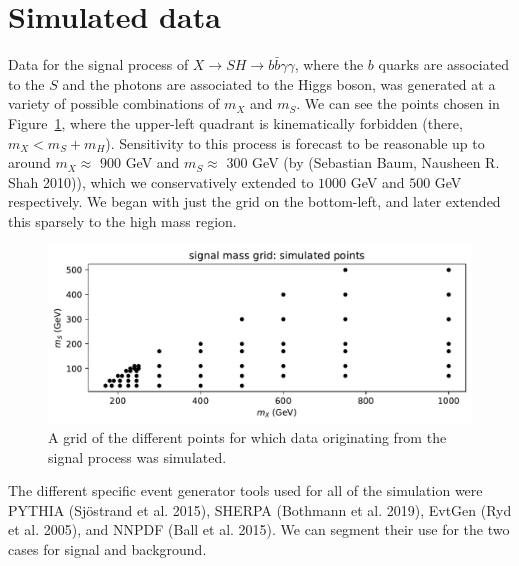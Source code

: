\documentclass[
  11pt,
  numbers=noendperiod]{book}
\begin{document}
\hypertarget{simulated-data}{%
\section{Simulated data}\label{simulated-data}}

Data for the signal process of
\(X\rightarrow SH \rightarrow b\bar{b}\gamma\gamma\), where the \(b\)
quarks are associated to the \(S\) and the photons are associated to the
Higgs boson, was generated at a variety of possible combinations of
\(m_X\) and \(m_S\). We can see the points chosen in
Figure~\ref{fig-mass-grid}, where the upper-left quadrant is
kinematically forbidden (there, \(m_X < m_S + m_H\)). Sensitivity to
this process is forecast to be reasonable up to around \(m_X \approx\)
$900$ GeV and \(m_S \approx\) $300$ GeV (by (Sebastian Baum, Nausheen R.
Shah 2010)), which we conservatively extended to $1000$ GeV and $500$ GeV
respectively. We began with just the grid on the bottom-left, and later
extended this sparsely to the high mass region.

\begin{figure}

{\centering \includegraphics{./images/sh/mass-grid.pdf}

}

\caption{\label{fig-mass-grid}A grid of the different points for which
data originating from the signal process was simulated.}

\end{figure}

The different specific event generator tools used for all of the
simulation were PYTHIA (Sjöstrand et al. 2015), SHERPA (Bothmann et al.
2019), EvtGen (Ryd et al. 2005), and NNPDF (Ball et al. 2015). We can
segment their use for the two cases for signal and background.
\end{document}
